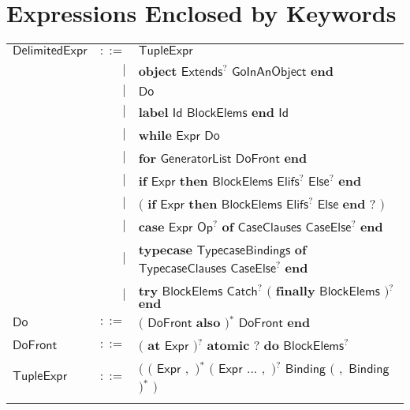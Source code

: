 \section{Expressions Enclosed by Keywords} 

 
\begin{longtable}[l]{p{3cm}rl}
$\mathsf{DelimitedExpr}$ &  $\mathsf{::=}$  & $\mathsf{TupleExpr}$ \\
 & $\big|$ &  $\mathbf{object}$ $\mathsf{Extends}$$^?$ $\mathsf{GoInAnObject}$ $\mathbf{end}$ \\
 & $\big|$ &  $\mathsf{Do}$ \\
 & $\big|$ &  $\mathbf{label}$ $\mathsf{Id}$ $\mathsf{BlockElems}$ $\mathbf{end}$ $\mathsf{Id}$ \\
 & $\big|$ &  $\mathbf{while}$ $\mathsf{Expr}$ $\mathsf{Do}$ \\
 & $\big|$ &  $\mathbf{for}$ $\mathsf{GeneratorList}$ $\mathsf{DoFront}$ $\mathbf{end}$ \\
 & $\big|$ &  $\mathbf{if}$ $\mathsf{Expr}$ $\mathbf{then}$ $\mathsf{BlockElems}$ $\mathsf{Elifs}$$^?$ $\mathsf{Else}$$^?$ $\mathbf{end}$ \\
 & $\big|$ &  $\big($  $\mathbf{if}$ $\mathsf{Expr}$ $\mathbf{then}$ $\mathsf{BlockElems}$ $\mathsf{Elifs}$$^?$ $\mathsf{Else}$ $\mathbf{end}$ $\mathbf{?}$ $\big)$ \\
 & $\big|$ &  $\mathbf{case}$ $\mathsf{Expr}$ $\mathsf{Op}$$^?$ $\mathbf{of}$ $\mathsf{CaseClauses}$ $\mathsf{CaseElse}$$^?$ $\mathbf{end}$ \\
 & $\big|$ &  $\mathbf{typecase}$ $\mathsf{TypecaseBindings}$ $\mathbf{of}$ $\mathsf{TypecaseClauses}$ $\mathsf{CaseElse}$$^?$ $\mathbf{end}$ \\
 & $\big|$ &  $\mathbf{try}$ $\mathsf{BlockElems}$ $\mathsf{Catch}$$^?$ $\big($  $\mathbf{finally}$ $\mathsf{BlockElems}$ $\big)$$^?$ $\mathbf{end}$ \\
$\mathsf{Do}$ &  $\mathsf{::=}$  & $\big($  $\mathsf{DoFront}$ $\mathbf{also}$ $\big)$$^*$ $\mathsf{DoFront}$ $\mathbf{end}$ \\
$\mathsf{DoFront}$ &  $\mathsf{::=}$  & $\big($  $\mathbf{at}$ $\mathsf{Expr}$ $\big)$$^?$ $\mathbf{atomic}$ $\mathbf{?}$ $\mathbf{do}$ $\mathsf{BlockElems}$$^?$ \\
$\mathsf{TupleExpr}$ &  $\mathsf{::=}$  & $\big($  $\big($  $\mathsf{Expr}$ $\mathbf{,}$ $\big)$$^*$ $\big($  $\mathsf{Expr}$ $\mathbf{...}$ $\mathbf{,}$ $\big)$$^?$ $\mathsf{Binding}$ $\big($  $\mathbf{,}$ $\mathsf{Binding}$ $\big)$$^*$ $\big)$ \\
$$
\end{longtable}
